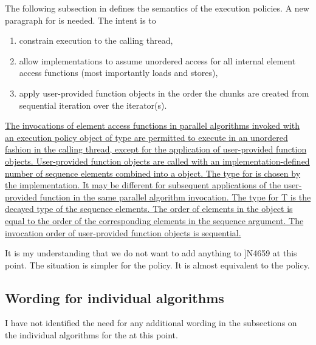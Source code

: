The following subsection in \citep[§28.4.3]{N4659} defines the semantics of the execution policies.
A new paragraph for \dataparEP is needed.
The intent is to
\begin{enumerate}
  \item constrain execution to the calling thread,
  \item allow implementations to assume unordered access for all internal element access functions (most importantly loads and stores),
  \item apply user-provided function objects in the order the \datapar chunks are created from sequential iteration over the iterator(s).
\end{enumerate}
\begin{wgText}
  \addtocounter{Paras}{7}%
  \color{WgAdd}%
  \uline{%
  \pnum
  The invocations of element access functions in parallel algorithms invoked with an execution policy object of type \dataparEPT are permitted to execute in an unordered fashion in the calling thread, except for the application of user-provided function objects.
  User-provided function objects are called with an im\-ple\-men\-ta\-tion-defined number of sequence elements combined into a }\underline{\datapar[<T, Abi>]}\uline{ object.
  The type for  is chosen by the implementation.
  It may be different for subsequent applications of the user-provided function in the same parallel algorithm invocation.
  The type for \type T is the decayed type of the sequence elements.
  The order of elements in the \datapar object is equal to the order of the corresponding elements in the sequence argument.
  The invocation order of user-provided function objects is sequential.
}
\end{wgText}

\newcommand\tmp{[algorithms.parallel.exceptions]}
It is my understanding that we do not want to add anything to \citep[§28.4.4 \tmp{}]{N4659} at this point.
The situation is simpler for the \dataparEP policy.
It is almost equivalent to the  policy.

\subsection{Wording for individual algorithms}
I have not identified the need for any additional wording in the subsections on the individual algorithms for the \dataparEPT at this point.


